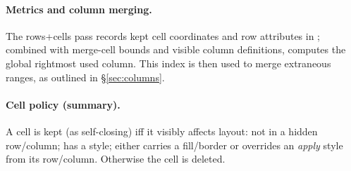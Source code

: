  
\paragraph*{Metrics and column merging.}
The rows+cells pass records kept cell coordinates and row attributes in
; combined with merge-cell bounds and visible column definitions,
 computes the global rightmost used column. This index is
then used to merge extraneous  ranges, as outlined in
\S\ref{sec:columns}.

 
















\paragraph{Cell policy (summary).}
A cell is kept (as self-closing) iff it visibly affects layout:
not in a hidden row/column; has a style; either carries a
fill/border or overrides an \emph{apply} style from its row/column.
Otherwise the cell is deleted.


\begin{algorithm}[t]
\caption{CleanCells — apply $p_{\text{cell}}$ with ReplaceCell}
\label{alg:clean-cells}
\DontPrintSemicolon
{}

\end{algorithm}

